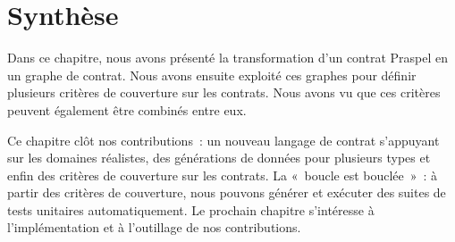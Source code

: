 \section{Synthèse}
\label{section:test:summary}

Dans ce chapitre, nous avons présenté la transformation d'un contrat Praspel en
un graphe de contrat. Nous avons ensuite exploité ces graphes pour définir
plusieurs critères de couverture sur les contrats. Nous avons vu que ces
critères peuvent également être combinés entre eux.

Ce chapitre clôt nos contributions~: un nouveau langage de contrat s'appuyant
sur les domaines réalistes, des générations de données pour plusieurs types et
enfin des critères de couverture sur les contrats. La «~boucle est bouclée~»~: à
partir des critères de couverture, nous pouvons générer et exécuter des suites
de tests unitaires automatiquement. Le prochain chapitre s'intéresse à
l'implémentation et à l'outillage de nos contributions.
